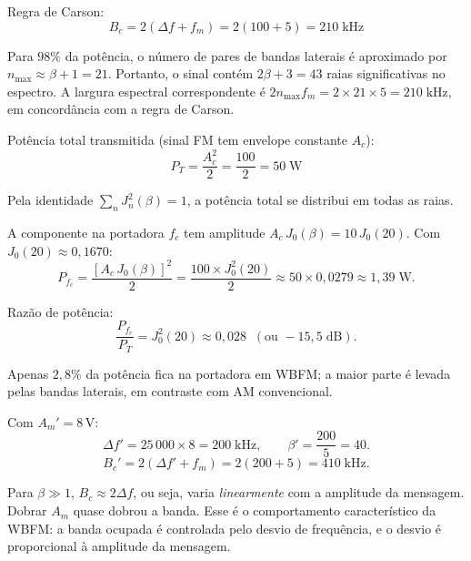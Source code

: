 \documentclass[11pt,a4paper]{article}
\begin{document}
\begin{resolucao}

Regra de Carson:
\[
  B_c = 2(\Delta f + f_m) = 2(100 + 5) = \boxed{210\;\text{kHz}}
\]

Para $98\%$ da potência, o número de pares de bandas laterais é aproximado por $n_{\max} \approx \beta + 1 = 21$. Portanto, o sinal contém $2\beta + 3 = 43$ raias significativas no espectro. A largura espectral correspondente é $2 n_{\max} f_m = 2 \times 21 \times 5 = 210\;\text{kHz}$, em concordância com a regra de Carson.
\end{resolucao}

\begin{resolucao}

Potência total transmitida (sinal FM tem envelope constante $A_c$):
\[
  \boxed{P_T = \frac{A_c^2}{2} = \frac{100}{2} = 50\;\text{W}}
\]

Pela identidade $\sum_n J_n^2(\beta) = 1$, a potência total se distribui em todas as raias.

A componente na portadora $f_c$ tem amplitude $A_c\,J_0(\beta) = 10\,J_0(20)$. Com $J_0(20) \approx 0{,}1670$:
\[
  P_{f_c} = \frac{[A_c\,J_0(\beta)]^2}{2} = \frac{100 \times J_0^2(20)}{2} \approx 50 \times 0{,}0279 \approx 1{,}39\;\text{W}.
\]

Razão de potência:
\[
  \frac{P_{f_c}}{P_T} = J_0^2(20) \approx 0{,}028 \;\;(\text{ou } -15{,}5\;\text{dB}).
\]

Apenas $2{,}8\%$ da potência fica na portadora em WBFM; a maior parte é levada pelas bandas laterais, em contraste com AM convencional.
\end{resolucao}

\begin{resolucao}

Com $A_m' = 8$\,V:
\[
  \Delta f' = 25{\,000} \times 8 = 200\;\text{kHz}, \qquad \beta' = \frac{200}{5} = 40.
\]
\[
  B_c' = 2(\Delta f' + f_m) = 2(200 + 5) = 410\;\text{kHz}.
\]

Para $\beta \gg 1$, $B_c \approx 2\Delta f$, ou seja, varia \emph{linearmente} com a amplitude da mensagem. Dobrar $A_m$ quase dobrou a banda. Esse é o comportamento característico da WBFM: a banda ocupada é controlada pelo desvio de frequência, e o desvio é proporcional à amplitude da mensagem.
\end{resolucao}

\end{document}
